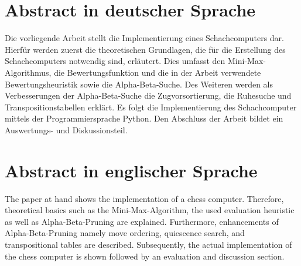 \section*{Abstract in deutscher Sprache}

Die vorliegende Arbeit stellt die Implementierung eines Schachcomputers dar.
Hierfür werden zuerst die theoretischen Grundlagen, die für die Erstellung des Schachcomputers notwendig sind, erläutert.
Dies umfasst den Mini-Max-Algorithmus, die Bewertungsfunktion und die in der Arbeit verwendete Bewertungsheuristik sowie die Alpha-Beta-Suche.
Des Weiteren werden als Verbesserungen der Alpha-Beta-Suche die Zugvorsortierung, die Ruhesuche und Transpositionstabellen erklärt.
Es folgt die Implementierung des Schachcomputer mittels der Programmiersprache Python.
Den Abschluss der Arbeit bildet ein Auswertungs- und Diskussionsteil.

\acresetall{}

\newpage \section*{Abstract in englischer Sprache}

The paper at hand shows the implementation of a chess computer.
Therefore, theoretical basics such as the Mini-Max-Algorithm, the used evaluation heuristic as well as Alpha-Beta-Pruning are explained.
Furthermore, enhancements of Alpha-Beta-Pruning namely move ordering, quiescence search, and transpositional tables are described.
Subsequently, the actual implementation of the chess computer is shown followed by an evaluation and discussion section.

\acresetall{}
